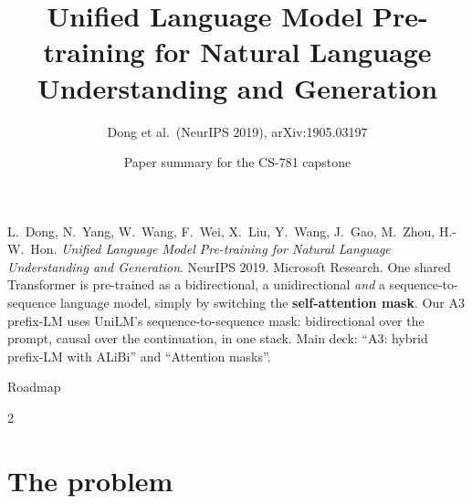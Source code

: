 \documentclass[aspectratio=169,11pt]{beamer}
\title[UniLM]{Unified Language Model Pre-training for Natural Language Understanding and Generation}
\subtitle{Dong et al.\ (NeurIPS 2019), arXiv:1905.03197}
\author[Paper summary]{Paper summary for the CS-781 capstone}
\date{}
\begin{document}
\begin{frame}\titlepage\end{frame}

\paperglance
{L.\ Dong, N.\ Yang, W.\ Wang, F.\ Wei, X.\ Liu, Y.\ Wang, J.\ Gao, M.\ Zhou, H.-W.\ Hon. \emph{Unified Language Model Pre-training for Natural Language Understanding and Generation}. NeurIPS 2019. Microsoft Research.}
{One shared Transformer is pre-trained as a bidirectional, a unidirectional \emph{and} a sequence-to-sequence language model, simply by switching the \textbf{self-attention mask}.}
{Our A3 prefix-LM uses UniLM's sequence-to-sequence mask: bidirectional over the prompt, causal over the continuation, in one stack.}
{Main deck: ``A3: hybrid prefix-LM with ALiBi'' and ``Attention masks''.}

\begin{frame}{Roadmap}
  \begin{multicols}{2}\small\tableofcontents\end{multicols}
\end{frame}

\section{The problem}
\end{document}
